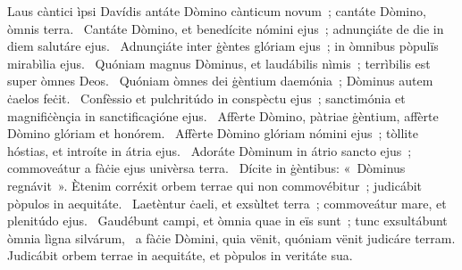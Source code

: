 { Laus càntici ìpsi Davídis}
{%
antáte Dòmino cànticum novum~; cantáte Dòmino, òmnis terra. 
~Cantáte Dòmino, et benedícite nómini ejus~; adnunçiáte de die in diem salutáre ejus. 
~Adnunçiáte inter ġèntes glóriam ejus~; in òmnibus pòpulïs mirabìlia ejus. 
~Quóniam magnus Dòminus, et laudábilis nìmis~; terrìbilis est super òmnes Deos. 
~Quóniam òmnes dei ġèntium daemónia~; Dòminus autem ċaelos feċit. 
~Confèssio et pulchritúdo in conspèctu ejus~; sanctimónia et magnifiċènçia in sanctificaçióne ejus. 
~Affèrte Dòmino, pàtriae ġèntium, affèrte Dòmino glóriam et honórem. 
~Affèrte Dòmino glóriam nómini ejus~; tòllite hóstias, et introíte in átria ejus. 
~Adoráte Dòminum in átrio sancto ejus~; commoveátur a fàċie ejus univèrsa terra. 
~Dícite in ġèntibus: «~Dòminus regnávit~». Ètenim corréxit orbem terrae qui non commovébitur~; judicábit pòpulos in aequitáte. 
~Laetèntur ċaeli, et exsùltet terra~; commoveátur mare, et plenitúdo ejus. 
~Gaudébunt campi, et òmnia quae in eïs sunt~; tunc exsultábunt òmnia lìgna silvárum, 
~a fàċie Dòmini, quia vënit, quóniam vënit judicáre terram. Judicábit orbem terrae in aequitáte, et pòpulos in veritáte sua. 
}
